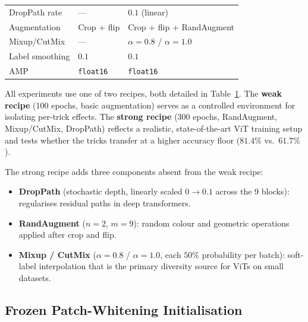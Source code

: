 \documentclass[10pt,twocolumn]{article}
\begin{document}
\begin{table}[ht]
\begin{minipage}[t]{0.58\linewidth}
\begin{tabular}{lll}
            DropPath rate   & ---              & $0.1$ (linear)                  \\
            Augmentation    & Crop + flip      & Crop + flip + RandAugment       \\
            Mixup/CutMix    & ---              & $\alpha=0.8$ / $\alpha=1.0$ \\
            Label smoothing & $0.1$            & $0.1$                           \\
            AMP             & \texttt{float16} & \texttt{float16}                \\
            \bottomrule
        \end{tabular}
        \label{tab:training-setup}
    \end{minipage}
\end{table}

All experiments use one of two recipes, both detailed in Table~\ref{tab:training-setup}. The \textbf{weak recipe} (100 epochs, basic augmentation) serves as a controlled environment for isolating per-trick effects. The \textbf{strong recipe} (300 epochs, RandAugment, Mixup/CutMix, DropPath) reflects a realistic, state-of-the-art ViT training setup and tests whether the tricks transfer at a higher accuracy floor ($81.4\%$ vs.\ $61.7\%$).

The strong recipe adds three components absent from the weak recipe:
\begin{itemize}[leftmargin=*]
    \item \textbf{DropPath} (stochastic depth, linearly scaled $0 \to 0.1$ across the 9 blocks): regularises residual paths in deep transformers.
    \item \textbf{RandAugment} ($n=2$, $m=9$): random colour and geometric operations applied after crop and flip.
    \item \textbf{Mixup / CutMix} ($\alpha=0.8$ / $\alpha=1.0$, each $50\%$ probability per batch): soft-label interpolation that is the primary diversity source for ViTs on small datasets.
\end{itemize}

\subsection{Frozen Patch-Whitening Initialisation}\label{sec:whitening}
\end{document}
